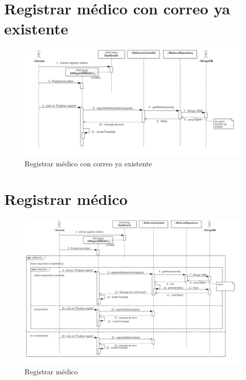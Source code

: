 \section{ Registrar médico con correo ya existente}

\begin{figure}[htbp!]
	\centering
	\includegraphics[width=1\textwidth]{uml/DiagramasSecuencia/DavidPacheco/registrar-medico-correo-ya-existe}
	\caption{Registrar médico con correo ya existente}
\end{figure}
\newpage
\section{Registrar médico}

\begin{figure}[htbp!]
	\centering
	\includegraphics[width=1\textwidth]{uml/DiagramasSecuencia/DavidPacheco/registrar-medico}
	\caption{Registrar médico}
\end{figure}
\newpage
